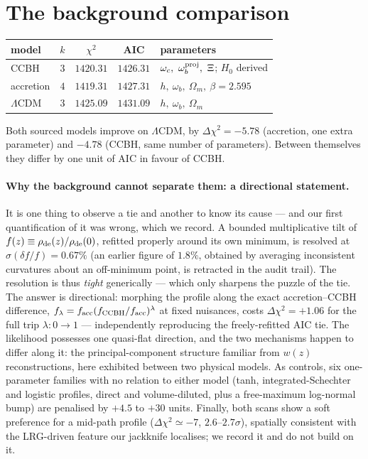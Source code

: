 \documentclass[11pt,a4paper]{article}
\begin{document}
\section{The background comparison}

\begin{center}
\begin{tabular}{lcccl}
\toprule
model & $k$ & $\chi^2$ & AIC & parameters \\
\midrule
CCBH & $3$ & $1420.31$ & $\mathbf{1426.31}$ & $\omega_c,\ \omega_b^{\rm proj},\ \Xi$; $H_0$ derived \\
accretion & $4$ & $1419.31$ & $1427.31$ & $h,\ \omega_b,\ \Omega_m,\ \beta = 2.595$ \\
$\Lambda$CDM & $3$ & $1425.09$ & $1431.09$ & $h,\ \omega_b,\ \Omega_m$ \\
\bottomrule
\end{tabular}
\end{center}

Both sourced models improve on $\Lambda$CDM, by $\Delta\chi^2 = -5.78$ (accretion, one extra
parameter) and $-4.78$ (CCBH, same number of parameters). Between themselves they differ by one
unit of AIC in favour of CCBH.

\paragraph{Why the background cannot separate them: a directional statement.} It is one
thing to observe a tie and another to know its cause --- and our first quantification of it was
wrong, which we record. A bounded multiplicative tilt of $f(z) \equiv \rho_{\rm de}(z)/
\rho_{\rm de}(0)$, refitted properly around its own minimum, is resolved at
$\sigma(\delta f/f) = 0.67\%$ (an earlier figure of $1.8\%$, obtained by averaging inconsistent
curvatures about an off-minimum point, is retracted in the audit trail). The resolution is thus
\emph{tight} generically --- which only sharpens the puzzle of the tie. The answer is
directional: morphing the profile along the exact accretion--CCBH difference,
$f_\lambda = f_{\rm acc}(f_{\rm CCBH}/f_{\rm acc})^{\lambda}$ at fixed nuisances, costs
$\Delta\chi^2 = +1.06$ for the full trip $\lambda: 0 \to 1$ --- independently reproducing the
freely-refitted AIC tie. The likelihood possesses one quasi-flat direction, and the two
mechanisms happen to differ along it: the principal-component structure familiar from $w(z)$
reconstructions, here exhibited between two physical models. As controls, six one-parameter
families with no relation to either model (tanh, integrated-Schechter and logistic profiles,
direct and volume-diluted, plus a free-maximum log-normal bump) are penalised by $+4.5$ to
$+30$ units. Finally, both scans show a soft preference for a mid-path profile
($\Delta\chi^2 \simeq -7$, $2.6$--$2.7\sigma$), spatially consistent with the LRG-driven
feature our jackknife localises; we record it and do not build on it.
\end{document}
